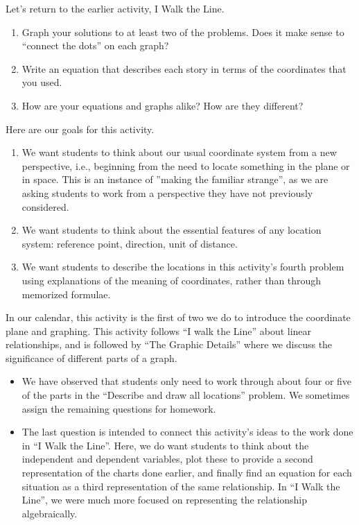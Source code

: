 \documentclass[nooutcomes]{ximera}
\begin{document}
\begin{problem}
Let's return to the earlier activity, I Walk the Line.
    \begin{enumerate}
        \item Graph your solutions to at least two of the problems.  Does it make sense to ``connect the dots'' on each graph?
        \item Write an equation that describes each story in terms of the coordinates that you used.
        \item How are your equations and graphs alike? How are they different?
    \end{enumerate}    

\end{problem}

\newpage
\begin{instructorNotes}
Here are our goals for this activity.
\begin{enumerate}
\item We want students to think about our usual coordinate system from a new perspective, i.e., beginning from the need to locate something in the plane or in space.  This is an instance of ''making the familiar strange'', as we are asking students to work from a perspective they have not previously considered.
\item  We want students to think about the essential features of any location system: reference point, direction, unit of distance.
\item We want students to describe the locations in this activity's fourth problem using explanations of the meaning of coordinates, rather than through memorized formulae.
\end{enumerate}

In our calendar, this activity is the first of two we do to introduce the coordinate plane and graphing.  This activity follows ``I walk the Line'' about linear relationships, and is followed by ``The Graphic Details'' where we discuss the significance of different parts of a graph.

\begin{itemize}
\item  We have observed that students only need to work through about four or five of the parts in the ``Describe and draw all locations'' problem.  We sometimes assign the remaining questions for homework.
\item  The last question is intended to connect this activity's ideas to the work done in ``I Walk the Line''.  Here, we do want students to think about the independent and dependent variables, plot these to provide a second representation of the charts done earlier, and finally find an equation for each situation as a third representation of the same relationship.  In ``I Walk the Line'', we were much more focused on representing the relationship algebraically.
\end{itemize}




\end{instructorNotes}
\end{document}
